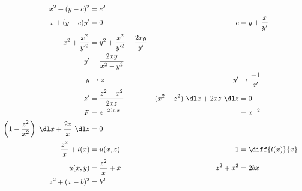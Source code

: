 \begin{enumerate}
          \begin{align}
              x^{2} + (y-c)^{2}                                                  & = c^{2}                                                                                                           \\
              x + (y-c)y'                                                        & = 0                                             & c                                   & =  y + \frac{x}{y'}       \\
              x^{2}  + \frac{x^{2}}{y'^{2}}                                      & = y^{2} + \frac{x^{2}}{y'^{2}} + \frac{2xy}{y'}                                                                   \\
              y'                                                                 & = \frac{2xy}{x^{2} - y^{2}}                                                                                       \\
              y                                                                  & \rightarrow z                                   & y'                                  & \rightarrow \frac{-1}{z'} \\
              z'                                                                 & = \frac{z^{2} - x^{2}}{2xz}                     & (x^{2} - z^{2})\ \dl x + 2xz\ \dl z & = 0                       \\
              F                                                                  & = e^{-2\ln x}                                   &                                     & = x^{-2}                  \\
              \left( 1 - \frac{z^{2}}{x^{2}}\right)\ \dl x + \frac{2z}{x}\ \dl z & = 0                                                                                                               \\
              \frac{z^{2}}{x} + l(x)                                             & = u(x, z)                                       & 1                                   & = \diff{l(x)}{x}          \\
              u(x, y)                                                            & = \frac{z^{2}}{x} + x                           & z^{2} + x^{2}                       & = 2bx                     \\
              z^{2} + (x - b)^{2}                                                & = b^{2}
          \end{align}


\end{enumerate}
